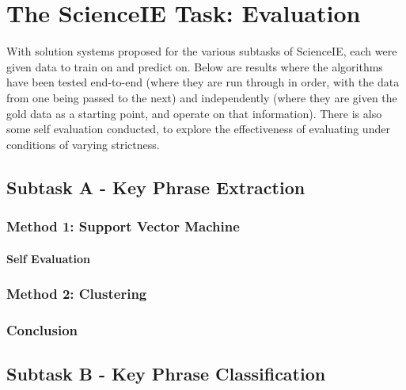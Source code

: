 \chapter{The ScienceIE Task: Evaluation}

With solution systems proposed for the various subtasks of ScienceIE, each were given data to train on and predict on. Below are results where the algorithms have been tested end-to-end (where they are run through in order, with the data from one being passed to the next) and independently (where they are given the gold data as a starting point, and operate on that information). There is also some self evaluation conducted, to explore the effectiveness of evaluating under conditions of varying strictness.

\section{Subtask A - Key Phrase Extraction}

\subsection{Method 1: Support Vector Machine}

\subsubsection{Self Evaluation}

\subsection{Method 2: Clustering}

\subsection{Conclusion}

\section{Subtask B - Key Phrase Classification}

